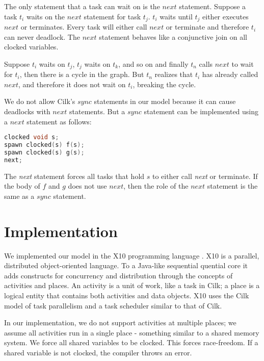 \documentclass[10pt, conference, compsocconf]{IEEEtran}
\begin{document}
The only statement that a task can wait on is the $next$ statement.
Suppose a task $t_i$ waits on the $next$ statement for task $t_j$.
$t_i$ waits until $t_j$ either executes $next$ or terminates.
Every task will either call $next$ or terminate and therefore
$t_i$ can never deadlock.
The $next$ statement  behaves like a conjunctive join on 
all clocked variables.

Suppose $t_i$ waits on $t_j$, $t_j$ waits on $t_k$, and so on
and finally $t_n$ calls $next$ to wait for $t_i$, then there is a cycle in the 
graph. But $t_n$ realizes that $t_i$ has already called $next$, and therefore
it does not wait on $t_i$, breaking the cycle.  

We do not allow Cilk's $sync$ statements in our model because it can cause
deadlocks with $next$ statements.
But a $sync$ statement can be implemented using a $next$ statement as follows:
\begin{lstlisting}[language=c]
clocked void s;
spawn clocked(s) f(s);
spawn clocked(s) g(s);
next;
\end{lstlisting}

The \emph{next} statement forces all tasks that hold $s$ to either
call \emph{next} or terminate. If the body of $f$ and $g$ does not
use $next$, then the role of the $next$ statement is the same as a $sync$
statement.


\section{Implementation}
\label{sec:implementation}

We implemented our model in the X10 programming language \cite{charles2005x10}.
X10 is a parallel, distributed object-oriented language. 
To a Java-like sequential 
quential core it adds constructs for concurrency and distribution through the 
concepts of activities and places. An activity is a unit of work, like a task in 
Cilk; a place is a logical entity that contains both activities and data objects.
X10 uses the Cilk model of task parallelism and a task scheduler similar to that
of Cilk.

In our implementation, we do not support activities at multiple places; we assume all activities run
in a single place - something similar to a shared memory system. 
We force all shared variables to be clocked. This forces
race-freedom. If a shared variable is not clocked, the compiler throws
an error.
\end{document}
